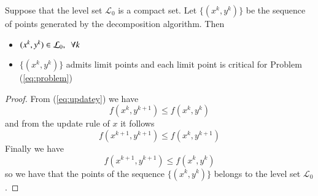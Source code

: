 \begin{proposition}
Suppose that the level set $\mathcal{L}_0$ is a compact set. Let $\{(x^k, y^k)\}$ be the sequence of points generated by the decomposition algorithm. Then
\begin{itemize}
\item $(x^k, y^k) \in \mathcal{L}_0, \enskip \forall k$ 
\item  $\{(x^k, y^k)\}$ admits limit points and each limit point is critical for Problem (\ref{eq:problem})
\end{itemize}
\end{proposition}
\begin{proof}
From (\ref{eq:updatey}) we have
\begin{equation}
f(x^{k}, y^{k+1}) \leq f(x^{k}, y^{k})
\end{equation}
and from the update rule of $x$ it follows
\begin{equation}\label{eq:dec}
f(x^{k+1}, y^{k+1}) \leq f(x^{k}, y^{k+1})
\end{equation}
Finally we have
\begin{equation}
f(x^{k+1}, y^{k+1}) \leq f(x^{k}, y^{k})
\end{equation}
so we have that the points of the sequence $\{(x^{k}, y^{k})\}$ belongs to the level set $\mathcal{L}_0$.
\vspace{1.5cm}


\end{proof}
